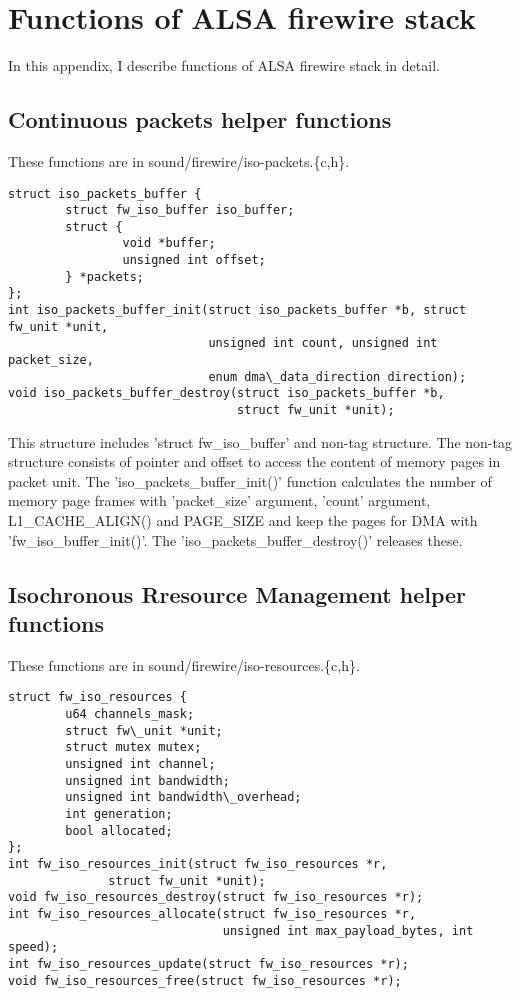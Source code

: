 \documentclass[onecolumn]{article}
\begin{document}
\newpage

\section{Functions of ALSA firewire stack}

In this appendix, I describe functions of ALSA firewire stack in detail.

\subsection{Continuous packets helper functions}

These functions are in sound/firewire/iso-packets.\{c,h\}.

\begin{verbatim}
struct iso_packets_buffer {
        struct fw_iso_buffer iso_buffer;
        struct {
                void *buffer;
                unsigned int offset;
        } *packets;
};
int iso_packets_buffer_init(struct iso_packets_buffer *b, struct fw_unit *unit,
                            unsigned int count, unsigned int packet_size,
                            enum dma\_data_direction direction);
void iso_packets_buffer_destroy(struct iso_packets_buffer *b,
                                struct fw_unit *unit);
\end{verbatim}

This structure includes 'struct fw\_iso\_buffer' and non-tag structure. The non-tag structure consists of pointer and offset to access the content of memory pages in packet unit. The 'iso\_packets\_buffer\_init()' function calculates the number of memory page frames with 'packet\_size' argument, 'count' argument, L1\_CACHE\_ALIGN() and PAGE\_SIZE and keep the pages for DMA with 'fw\_iso\_buffer\_init()'. The 'iso\_packets\_buffer\_destroy()' releases these.

\subsection{Isochronous Rresource Management helper functions}

These functions are in sound/firewire/iso-resources.\{c,h\}.

\begin{verbatim}
struct fw_iso_resources {
        u64 channels_mask;
        struct fw\_unit *unit;
        struct mutex mutex;
        unsigned int channel;
        unsigned int bandwidth;
        unsigned int bandwidth\_overhead;
        int generation;
        bool allocated;
};
int fw_iso_resources_init(struct fw_iso_resources *r,
			  struct fw_unit *unit);
void fw_iso_resources_destroy(struct fw_iso_resources *r);
int fw_iso_resources_allocate(struct fw_iso_resources *r,
                              unsigned int max_payload_bytes, int speed);
int fw_iso_resources_update(struct fw_iso_resources *r);
void fw_iso_resources_free(struct fw_iso_resources *r);
\end{verbatim}
\end{document}
